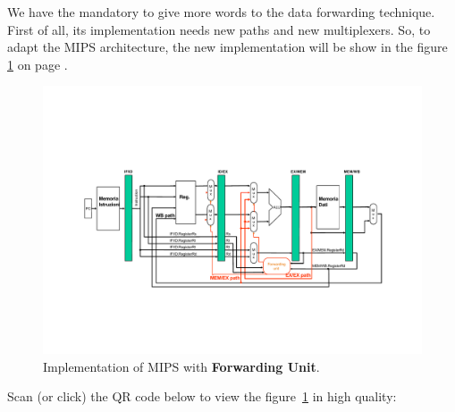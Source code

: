 \documentclass[a4paper]{article}
\newcommand{\definition}[1]{\textcolor{Red3}{\textbf{#1}}\index{#1}}
\begin{document}
    We have the mandatory to give more words to the data forwarding technique. First of all, its implementation needs new paths and new multiplexers. So, to adapt the MIPS architecture, the new implementation will be show in the figure \ref{fig: implementation of MIPS with Forwarding Unit} on page \pageref{fig: implementation of MIPS with Forwarding Unit}.

    \newpage
    
    \begin{figure}[!htp]
        \centering
        \includegraphics[width=\textwidth]{img/implementation-mips-forwarding-unit-1.pdf}
        \caption{Implementation of MIPS with \definition{Forwarding Unit}.\cite{pipelining-slides}}
        \label{fig: implementation of MIPS with Forwarding Unit}
    \end{figure}

    \noindent
    Scan (or click) the QR code below to view the figure~\ref{fig: implementation of MIPS with Forwarding Unit} in high quality:
    \begin{center}
    \end{center}
    
\end{document}
